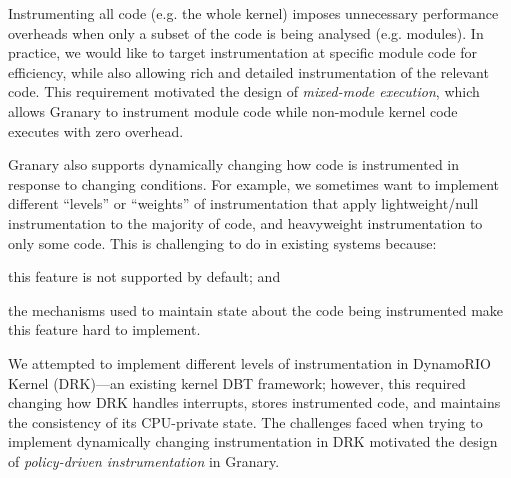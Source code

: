 \documentclass[letterpaper,twocolumn,10pt]{article}
\begin{document}

Instrumenting all code (e.g. the whole kernel) imposes unnecessary performance overheads when only a subset of the code is being analysed (e.g. modules). In practice, we would like to target instrumentation at specific module code for efficiency, while also allowing rich and detailed instrumentation of the relevant code. This requirement motivated the design of \emph{mixed-mode execution}, which allows Granary to instrument module code while non-module kernel code executes with zero overhead.

Granary also supports dynamically changing how code is instrumented in response to changing conditions. For example,  we sometimes want to implement different ``levels'' or ``weights'' of instrumentation that apply lightweight/null instrumentation to the majority of code, and heavyweight instrumentation to only some code. This is challenging to do in existing  systems because: \begin{inparaenum}[i)]
	\item this feature is not supported by default; and
	\item the mechanisms used to maintain state about the code being instrumented make this feature hard to implement.
\end{inparaenum} We attempted to implement different levels of instrumentation in DynamoRIO Kernel (DRK)---an existing kernel DBT framework; however, this required changing how DRK handles interrupts, stores instrumented code, and maintains the consistency of its CPU-private state. The challenges faced when trying to implement dynamically changing instrumentation in DRK motivated the design of \emph{policy-driven instrumentation} in Granary.
\end{document}
